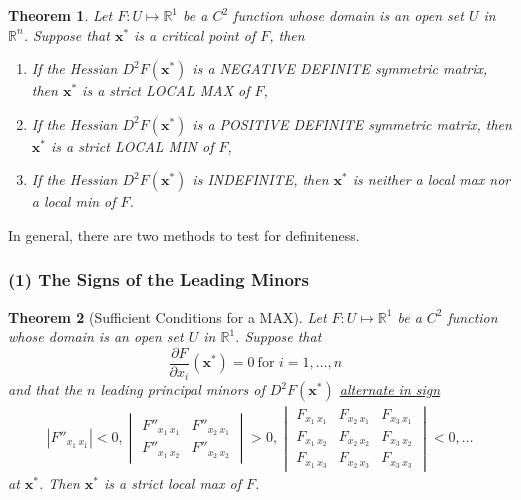 \documentclass[11pt,a4paper]{book}
\newtheorem{theorem}{Theorem}[section]
\theoremstyle{definition}\newtheorem{definition}{Definition}
\theoremstyle{definition}\newtheorem{fact}{Fact}
\theoremstyle{definition}\newtheorem{remark}{Remark}
\theoremstyle{definition}\newtheorem{ex}{Ex.}
\theoremstyle{definition}\newtheorem{project}{Project}
\theoremstyle{definition}\newtheorem{problem}{Problem}
\theoremstyle{definition}\newtheorem{example}{Example}
\newenvironment{ftheorem}
{\begin{mdframed}\begin{theorem}}
		{\end{theorem}\end{mdframed}}
\numberwithin{theorem}{section}
\numberwithin{corollary}{chapter}
\numberwithin{assumption}{chapter}
\numberwithin{definition}{chapter}
\numberwithin{prop}{chapter}
\numberwithin{notation}{chapter}
\numberwithin{problem}{chapter}
\numberwithin{example}{chapter}
\numberwithin{fact}{chapter}
\numberwithin{ex}{chapter}
\def\R{\mathbb R}
\def\R{\mathbb R}
\def\x{\mathbf x}
\begin{document}
	\begin{ftheorem}
		Let $F: U \mapsto \R^1$ be a $C^2$ function whose domain is an open set $U$ in $\R^n$. Suppose that $\x^*$ is a critical point of $F$, then
		\begin{enumerate}
			\item If the Hessian $D^2 F(\x^*)$ is a NEGATIVE DEFINITE symmetric matrix, then $\x^*$ is a strict LOCAL MAX of $F$,
			\item If the Hessian $D^2 F(\x^*)$ is a POSITIVE DEFINITE symmetric matrix, then $\x^*$ is a strict LOCAL MIN of $F$,
			\item If the Hessian $D^2 F(\x^*)$ is INDEFINITE, then $\x^*$ is neither a local max nor a local min of $F$.
		\end{enumerate}
	\end{ftheorem}
	
	In general, there are two methods to test for definiteness.
	
	\subsubsection{(1) The Signs of the Leading Minors}
	\begin{ftheorem}[Sufficient Conditions for a MAX]
		Let $F: U \mapsto \R^1$ be a $C^2$ function whose domain is an open set $U$ in $\R^1$. Suppose that
		\begin{equation*}
			\frac{\partial F}{\partial x_i} (\x^*) = 0 \ \text{for $i = 1, \dots, n$ }
		\end{equation*}
		and that the $n$ leading principal minors of $D^2 F(\x^*)$ \underline{alternate in sign}
		\begin{align*}
			|F''_{x_1 \ x_1}| < 0, 
			\begin{vmatrix}
				F''_{x_1 \ x_1} & F''_{x_2 \ x_1} \\
				F''_{x_1 \ x_2} & F''_{x_2 \ x_2} 
			\end{vmatrix} > 0,
			\begin{vmatrix}
				F_{x_1 \ x_1} & F_{x_2 \ x_1} & F_{x_3 \ x_1} \\
				F_{x_1 \ x_2} & F_{x_2 \ x_2} & F_{x_3 \ x_2} \\
				F_{x_1 \ x_3} & F_{x_2 \ x_3} & F_{x_3 \ x_3} 
			\end{vmatrix} < 0, \dots
		\end{align*}
		at $\x^*$. Then $\x^*$ is a strict local max of $F$.
	\end{ftheorem}
	
\end{document}
